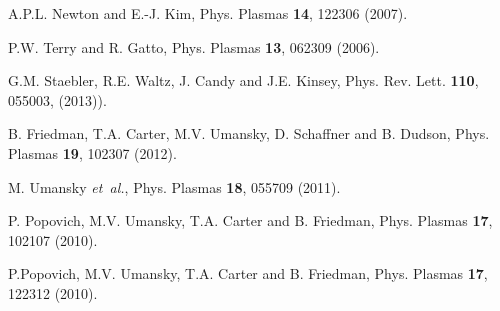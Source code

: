 \documentclass[aip,pop,amsmath,amssymb,reprint,superscriptaddress]{revtex4-1} %
\begin{document}
\begin{thebibliography}{10}
A.P.L. Newton and E.-J. Kim, Phys. Plasmas {\bf 14}, 122306 (2007).

P.W. Terry and R. Gatto, Phys. Plasmas {\bf 13}, 062309 (2006).

G.M. Staebler, R.E. Waltz, J. Candy and J.E. Kinsey, Phys. Rev. Lett. {\bf 110}, 055003, (2013)).

B. Friedman, T.A. Carter, M.V. Umansky, D. Schaffner and B. Dudson, Phys. Plasmas {\bf 19}, 102307 (2012).

M. Umansky {\it et~al.}, Phys. Plasmas {\bf 18},  055709  (2011).

P. Popovich, M.V. Umansky, T.A. Carter and B. Friedman, Phys. Plasmas {\bf 17}, 102107 (2010).

P.Popovich, M.V. Umansky, T.A. Carter and B. Friedman, Phys. Plasmas {\bf 17}, 122312 (2010).

\end{thebibliography}
\end{document}
